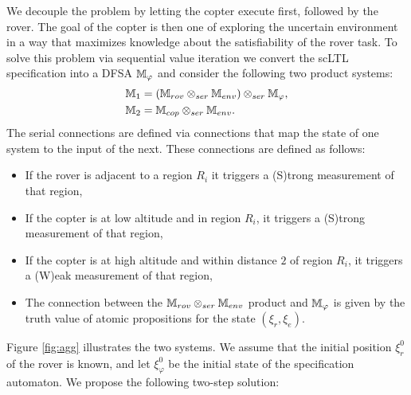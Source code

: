 \documentclass[conference]{IEEEtran}
\begin{document}
We decouple the problem by letting the copter execute first, followed by the rover. The goal of the copter is then one of exploring the uncertain environment in a way that maximizes knowledge about the satisfiability of the rover task. To solve this problem via sequential value iteration we convert the scLTL specification into a DFSA $\mathbb{M}_{\varphi}$ and consider the following two product systems:
\begin{equation}
\begin{aligned}
  \mathbb{M}_{1} &= \left( \mathbb{M}_{rov} \otimes_{ser} \mathbb{M}_{env} \right) \otimes_{ser} \mathbb{M}_{\varphi}, \\
  \mathbb{M}_{2} &= \mathbb{M}_{cop} \otimes_{ser} \mathbb{M}_{env}.
\end{aligned}
\end{equation}
The serial connections are defined via connections that map the state of one system to the input of the next. These connections are defined as follows:
\begin{itemize}
  \item If the rover is adjacent to a region $R_i$ it triggers a (S)trong measurement of that region,
  \item If the copter is at low altitude and in region $R_i$, it triggers a (S)trong measurement of that region,
  \item If the copter is at high altitude and within distance $2$ of region $R_i$, it triggers a (W)eak measurement of that region,
  \item The connection between the $\mathbb{M}_{rov} \otimes_{ser} \mathbb{M}_{env}$ product and $\mathbb{M}_{\varphi}$ is given by the truth value of atomic propositions for the state $(\xi_r, \xi_e)$.
\end{itemize}
Figure \ref{fig:agg} illustrates the two systems. We assume that the initial position $\xi_r^0$ of the rover is known, and let $\xi_\varphi^0$ be the initial state of the specification automaton. We propose the following two-step solution:
\end{document}
